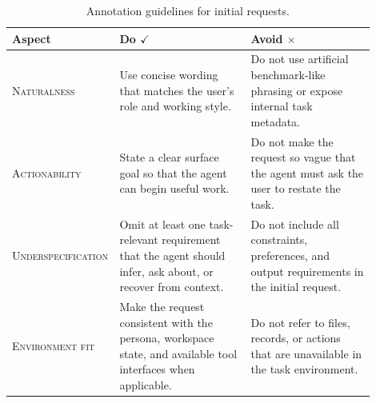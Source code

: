 \begin{table}[tb]
\centering
\caption{Annotation guidelines for initial requests.}
\label{tab:annotation_initial_request}
\small
\begin{tabular}{p{0.20\linewidth}p{0.36\linewidth}p{0.34\linewidth}}
\toprule[1.25pt]
\textbf{Aspect} & \textbf{Do} $\checkmark$ & \textbf{Avoid} $\times$ \\
\midrule[0.75pt]
\textsc{Naturalness} &
Use concise wording that matches the user's role and working style. &
Do not use artificial benchmark-like phrasing or expose internal task metadata. \\
\midrule[0.75pt]
\textsc{Actionability} &
State a clear surface goal so that the agent can begin useful work. &
Do not make the request so vague that the agent must ask the user to restate the task. \\
\midrule[0.75pt]
\textsc{Underspecification} &
Omit at least one task-relevant requirement that the agent should infer, ask about, or recover from context. &
Do not include all constraints, preferences, and output requirements in the initial request. \\
\midrule[0.75pt]
\textsc{Environment fit} &
Make the request consistent with the persona, workspace state, and available tool interfaces when applicable. &
Do not refer to files, records, or actions that are unavailable in the task environment. \\
\bottomrule[1.25pt]
\end{tabular}
\end{table}